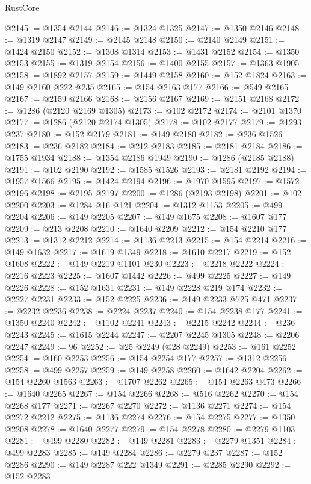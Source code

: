 \begin{lexlean}{RustCore}
\begin{coremodule}
@2145 := @1354 @2144
@2146 := @1324 @1325
@2147 := @1350 @2146
@2148 := @1319 @2147
@2149 := @2145 @2148
@2150 := @2140 @2149
@2151 := @1424 @2150
@2152 := @1308 @1314
@2153 := @1431 @2152
@2154 := @1350 @2153
@2155 := @1319 @2154
@2156 := @1400 @2155
@2157 := @1363 @1905
@2158 := @1892 @2157
@2159 := @1449 @2158
@2160 := @152 @1824
@2163 := @149 @2160 @222 @235
@2165 := @154 @2163 @177
@2166 := @549 @2165
@2167 := @2159 @2166
@2168 := @2156 @2167
@2169 := @2151 @2168
@2172 := @1286 (@2120 @2169 @1305)
@2173 := @102 @2172
@2174 := @2101 @1370
@2177 := @1286 (@2120 @2174 @1305)
@2178 := @102 @2177
@2179 := @1293 @237
@2180 := @152 @2179
@2181 := @149 @2180
@2182 := @236 @1526
@2183 := @236 @2182
@2184 := @212 @2183
@2185 := @2181 @2184
@2186 := @1755 @1934
@2188 := @1354 @2186 @1949
@2190 := @1286 (@2185 @2188)
@2191 := @102 @2190
@2192 := @1585 @1526
@2193 := @2181 @2192
@2194 := @1957 @1566
@2195 := @1424 @2194
@2196 := @1970 @1595
@2197 := @1572 @2196
@2198 := @2195 @2197
@2200 := @1286 (@2193 @2198)
@2201 := @102 @2200
@2203 := @1284 @16 @121
@2204 := @1312 @1153
@2205 := @499 @2204
@2206 := @149 @2205
@2207 := @149 @1675
@2208 := @1607 @177
@2209 := @213 @2208
@2210 := @1640 @2209
@2212 := @154 @2210 @177
@2213 := @1312 @2212
@2214 := @1136 @2213
@2215 := @154 @2214
@2216 := @149 @1632
@2217 := @1619 @1349
@2218 := @1610 @2217
@2219 := @152 @1608
@2222 := @149 @2219 @1101 @230
@2223 := @2218 @2222
@2224 := @2216 @2223
@2225 := @1607 @1442
@2226 := @499 @2225
@2227 := @149 @2226
@2228 := @152 @1631
@2231 := @149 @2228 @219 @174
@2232 := @2227 @2231
@2233 := @152 @2225
@2236 := @149 @2233 @725 @471
@2237 := @2232 @2236
@2238 := @2224 @2237
@2240 := @154 @2238 @177
@2241 := @1350 @2240
@2242 := @1102 @2241
@2243 := @2215 @2242
@2244 := @236 @2243
@2245 := @1615 @2244
@2247 := @2207 @2245 @1305
@2248 := @2206 @2247
@2249 := 96
@2252 := @25 @2249 (@28 @2249)
@2253 := @161 @2252
@2254 := @160 @2253
@2256 := @154 @2254 @177
@2257 := @1312 @2256
@2258 := @499 @2257
@2259 := @149 @2258
@2260 := @1642 @2204
@2262 := @154 @2260 @1563
@2263 := @1707 @2262
@2265 := @154 @2263 @473
@2266 := @1640 @2265
@2267 := @154 @2266
@2268 := @516 @2262
@2270 := @154 @2268 @177
@2271 := @2267 @2270
@2272 := @1136 @2271
@2274 := @154 @2272 @2212
@2275 := @1136 @2274
@2276 := @154 @2275
@2277 := @1350 @2208
@2278 := @1640 @2277
@2279 := @154 @2278
@2280 := @2279 @1103
@2281 := @499 @2280
@2282 := @149 @2281
@2283 := @2279 @1351
@2284 := @499 @2283
@2285 := @149 @2284
@2286 := @2279 @237
@2287 := @152 @2286
@2290 := @149 @2287 @222 @1349
@2291 := @2285 @2290
@2292 := @152 @2283

\end{coremodule}
\end{lexlean}
